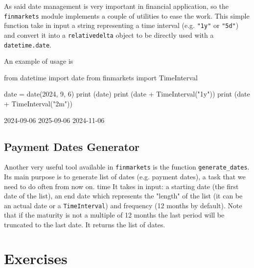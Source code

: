 \begin{finmarkets}
As said date management is very important in financial application, so the \texttt{finmarkets} module implements a couple of utilities to ease the work. 
This simple function take in input a string representing a time interval (e.g. \texttt{"1y"} or \texttt{"5d"}) and convert it into a \texttt{relativedelta} object to be directly used with a \texttt{datetime.date}.
\end{finmarkets}

An example of usage is
\begin{ipythonnon}
from datetime import date
from finmarkets import TimeInterval

date = date(2024, 9, 6)
print (date)
print (date + TimeInterval("1y"))
print (date + TimeInterval("2m"))
\end{ipythonnon}
\begin{ioutput}
2024-09-06
2025-09-06
2024-11-06
\end{ioutput}

\subsection{Payment Dates Generator}

\begin{finmarkets}
Another very useful tool available in \texttt{finmarkets} is the function \texttt{generate\_dates}. Its main purpose is to generate list of dates (e.g. payment dates), a task that we need to do often from now on. 
time
It takes in input: a starting date (the first date of the list), an end date which represents the "length" of the list (it can be an actual date or a \texttt{TimeInterval}) and frequency (12 months by default). Note that if the maturity is not a multiple of 12 months the last period will be truncated to the last date. It returns the list of dates.
\end{finmarkets}


\begin{ioutput}
\end{ioutput}

\section*{Exercises}


